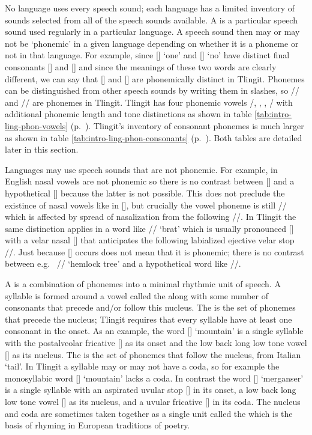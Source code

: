No language uses every speech sound; each language has a limited inventory of sounds selected from all of the speech sounds available.
A  is a particular speech sound used regularly in a particular language.
A speech sound then may or may not be ‘phonemic’ in a given language depending on whether it is a phoneme or not in that language.
For example, since  [] ‘one’ and  [] ‘no’ have distinct final consonants [] and [] and since the meanings of these two words are clearly different, we can say that [] and [] are phonemically distinct in Tlingit.
Phonemes can be distinguished from other speech sounds by writing them in slashes, so // and // are phonemes in Tlingit.
Tlingit has four phonemic vowels /, , , / with additional phonemic length and tone distinctions as shown in table \ref{tab:intro-ling-phon-vowels} (p.\ \pageref{tab:intro-ling-phon-vowels}).
Tlingit’s inventory of consonant phonemes is much larger as shown in table \ref{tab:intro-ling-phon-consonants} (p.\ \pageref{tab:intro-ling-phon-consonants}).
Both tables are detailed later in this section.

Languages may use speech sounds that are not phonemic.
For example, in English nasal vowels are not phonemic so there is no contrast between  [] and a hypothetical  [] because the latter is not possible.
This does not preclude the existince of nasal vowels like in  [], but crucially the vowel phoneme is still // which is affected by spread of nasalization from the following //.
In Tlingit the same distinction applies in a word like  // ‘brat’ which is usually pronounced [] with a velar nasal [] that anticipates the following labialized ejective velar stop //.
Just because [] occurs does not mean that it is phonemic; there is no contrast between e.g.\  // ‘hemlock tree’ and a hypothetical word like  //.

A  is a combination of phonemes into a minimal rhythmic unit of speech.
A syllable is formed around a vowel called the  along with some number of consonants that precede and/or follow this nucleus.
The  is the set of phonemes that precede the nucleus; Tlingit requires that every syllable have at least one consonant in the onset.
As an example, the word  [] ‘mountain’ is a single syllable with the postalveolar fricative [] as its onset and the low back long low tone vowel [] as its nucleus.
The  is the set of phonemes that follow the nucleus, from Italian  ‘tail’.
In Tlingit a syllable may or may not have a coda, so for example the monosyllabic word  [] ‘mountain’ lacks a coda.
In contrast the word  [] ‘merganser’ is a single syllable with an aspirated uvular stop [] in its onset, a low back long low tone vowel [] as its nucleus, and a uvular fricative [] in its coda.
The nucleus and coda are sometimes taken together as a single unit called the  which is the basis of rhyming in European traditions of poetry.

